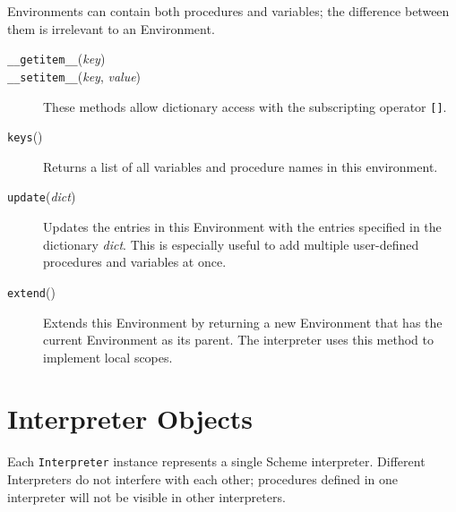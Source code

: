 \documentclass{report}
\newcommand{\code}[1]{\texttt{#1}}
\newcommand{\function}[1]{\code{#1}}
\newcommand{\param}[1]{\textmd{\textit{#1}}}
\begin{document}
Environments can contain both procedures and variables; the difference
between them is irrelevant to an Environment. 

\begin{description}

\item[\function{\_\_getitem\_\_}(\param{key})]
\item[\function{\_\_setitem\_\_}(\param{key}, \param{value})] These
methods allow dictionary access with the subscripting operator
\code{[]}.

\item[\function{keys}()] Returns a list of all variables and procedure
names in this environment.

\item[\function{update}(\param{dict})] Updates the entries in this
Environment with the entries specified in the dictionary
\param{dict}. This is especially useful to add multiple user-defined
procedures and variables at once.

\end{description}

\begin{description}

\item[\function{extend}()] Extends this Environment by returning a new
Environment that has the current Environment as its parent. The
interpreter uses this method to implement local scopes. 

\end{description}


\section{Interpreter Objects}
Each \code{Interpreter} instance represents a single Scheme
interpreter. Different Interpreters do not interfere with each other;
procedures defined in one interpreter will not be visible in other
interpreters. 
\end{document}
